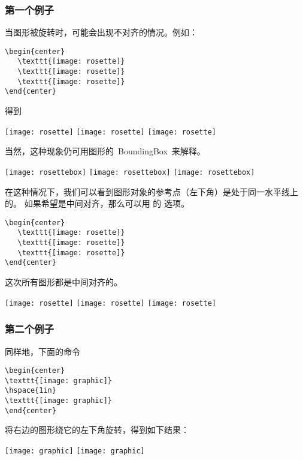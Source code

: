\subsubsection{第一个例子}

当图形被旋转时，可能会出现不对齐的情况。例如：

\begin{lstlisting}
\begin{center}
   \texttt{[image: rosette]}
   \texttt{[image: rosette]}
   \texttt{[image: rosette]}
\end{center}
\end{lstlisting}
得到

\begin{center}
   \texttt{[image: rosette]}
   \texttt{[image: rosette]}
   \texttt{[image: rosette]}
\end{center}
当然，这种现象仍可用图形的~BoundingBox~来解释。

\begin{center}
   \texttt{[image: rosettebox]}
   \texttt{[image: rosettebox]}
   \texttt{[image: rosettebox]}
\end{center}
在这种情况下，我们可以看到图形对象的参考点（左下角）是处于同一水平线上的。
如果希望是中间对齐，那么可以用  的  选项。
\begin{lstlisting}
\begin{center}
   \texttt{[image: rosette]}
   \texttt{[image: rosette]}
   \texttt{[image: rosette]}
\end{center}
\end{lstlisting}
这次所有图形都是中间对齐的。

\begin{center}
   \texttt{[image: rosette]}
   \texttt{[image: rosette]}
   \texttt{[image: rosette]}
\end{center}

\subsubsection{第二个例子}
同样地，下面的命令
\begin{lstlisting}
\begin{center}
\texttt{[image: graphic]}
\hspace{1in}
\texttt{[image: graphic]}
\end{center}
\end{lstlisting}
将右边的图形绕它的左下角旋转，得到如下结果：
\begin{center}
	\texttt{[image: graphic]}
	\hspace{1in}
	\texttt{[image: graphic]}
\end{center}

